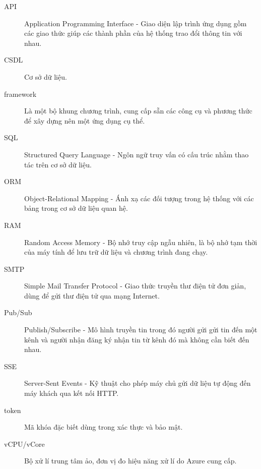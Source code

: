 \documentclass[../main.tex]{subfiles}
\begin{document}
\begin{description}
    \item[API] Application Programming Interface - Giao diện lập trình ứng dụng gồm các giao thức giúp các thành phần của hệ thống trao đổi thông tin với nhau.
    \item[CSDL] Cơ sở dữ liệu. 
    \item[framework] Là một bộ khung chương trình, cung cấp sẵn các công cụ và phương thức để xây dựng nên một ứng dụng cụ thể.
    \item[SQL] Structured Query Language - Ngôn ngữ truy vấn có cấu trúc nhằm thao tác trên cơ sở dữ liệu.
    \item[ORM] Object-Relational Mapping - Ánh xạ các đối tượng trong hệ thống với các bảng trong cơ sở dữ liệu quan hệ.
    \item[RAM] Random Access Memory - Bộ nhớ truy cập ngẫu nhiên, là bộ nhớ tạm thời của máy tính để lưu trữ dữ liệu và chương trình đang chạy.
    \item[SMTP] Simple Mail Transfer Protocol - Giao thức truyền thư điện tử đơn giản, dùng để gửi thư điện tử qua mạng Internet.
    \item[Pub/Sub] Publish/Subscribe - Mô hình truyền tin trong đó người gửi gửi tin đến một kênh và người nhận đăng ký nhận tin từ kênh đó mà không cần biết đến nhau.
    \item[SSE] Server-Sent Events - Kỹ thuật cho phép máy chủ gửi dữ liệu tự động đến máy khách qua kết nối HTTP.
    \item[token] Mã khóa đặc biết dùng trong xác thực và bảo mật.
    \item[vCPU/vCore] Bộ xử lí trung tâm ảo, đơn vị đo hiệu năng xử lí do Azure cung cấp. 
\end{description}
\end{document}
